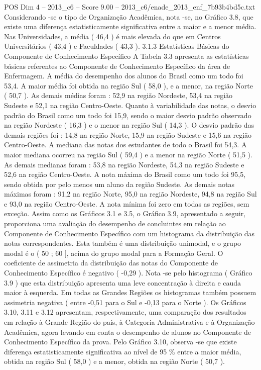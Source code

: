 \begin{textsample}{POS Dim 4 – 2013\_c6 – Score 9.00 – 2013\_c6/enade\_2013\_enf\_7b93b4bd5c.txt}
Considerando -se o tipo de Organização Acadêmica, nota -se, no Gráfico 3.8, que existe uma diferença estatisticamente significativa entre a maior e a menor média.
Nas Universidades, a média ( 46,4 ) é mais elevada do que em Centros Universitários ( 43,4 ) e Faculdades ( 43,3 ). 3.1.3 Estatísticas Básicas do Componente de Conhecimento Específico A Tabela 3.3 apresenta as estatísticas básicas referentes ao Componente de Conhecimento Específico da área de Enfermagem.
A média do desempenho dos alunos do Brasil como um todo foi 53,4.
A maior média foi obtida na região Sul ( 58,0 ), e a menor, na região Norte ( 50,7 ).
As demais médias foram : 52,9 na região Nordeste, 53,4 na região Sudeste e 52,1 na região Centro-Oeste.
Quanto à variabilidade das notas, o desvio padrão do Brasil como um todo foi 15,9, sendo o maior desvio padrão observado na região Nordeste ( 16,3 ) e o menor na região Sul ( 14,3 ).
O desvio padrão das demais regiões foi : 14,8 na região Norte, 15,9 na região Sudeste e 15,6 na região Centro-Oeste.
A mediana das notas dos estudantes de todo o Brasil foi 54,3.
A maior mediana ocorreu na região Sul ( 59,4 ) e a menor na região Norte ( 51,5 ).
As demais medianas foram : 53,8 na região Nordeste, 54,3 na região Sudeste e 52,6 na região Centro-Oeste.
A nota máxima do Brasil como um todo foi 95,5, sendo obtida por pelo menos um aluno da região Sudeste.
As demais notas máximas foram : 91,2 na região Norte, 95,0 na região Nordeste, 94,8 na região Sul e 93,0 na região Centro-Oeste.
A nota mínima foi zero em todas as regiões, sem exceção.
Assim como os Gráficos 3.1 e 3.5, o Gráfico 3.9, apresentado a seguir, proporciona uma avaliação do desempenho de concluintes em relação ao Componente de Conhecimento Específico com um histograma da distribuição das notas correspondentes.
Esta também é uma distribuição unimodal, e o grupo modal é o ( 50 ; 60 ], acima do grupo modal para a Formação Geral.
O coeficiente de assimetria da distribuição das notas do Componente de Conhecimento Específico é negativo ( -0,29 ).
Nota -se pelo histograma ( Gráfico 3.9 ) que esta distribuição apresenta uma leve concentração à direita e cauda maior à esquerda.
Em todas as Grandes Regiões os histogramas também possuem assimetria negativa ( entre -0,51 para o Sul e -0,13 para o Norte ).
Os Gráficos 3.10, 3.11 e 3.12 apresentam, respectivamente, uma comparação dos resultados em relação à Grande Região do país, à Categoria Administrativa e à Organização Acadêmica, agora levando em conta o desempenho de alunos no Componente de Conhecimento Específico da prova.
Pelo Gráfico 3.10, observa -se que existe diferença estatisticamente significativa ao nível de 95 \% entre a maior média, obtida na região Sul ( 58,0 ) e a menor, obtida na região Norte ( 50,7 ).

\end{textsample}
